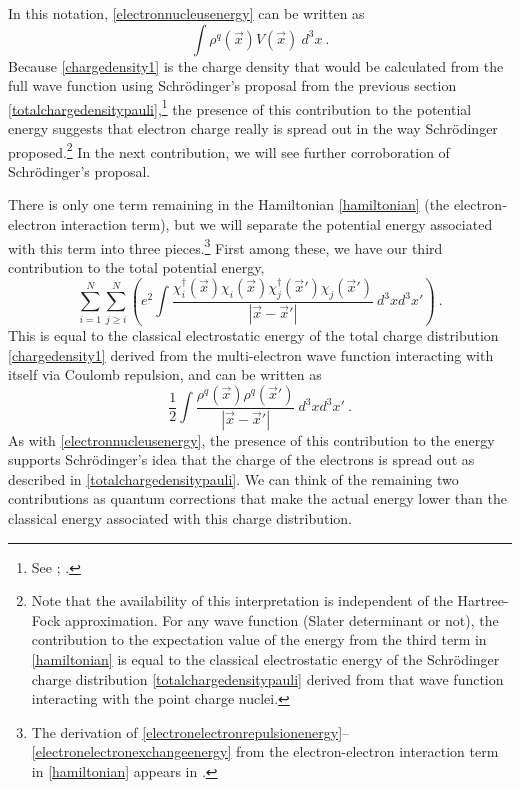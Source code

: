 \documentclass[onecolumn,secnumarabic,amsmath,amssymb,balancelastpage,nofootinbib]{article}
\begin{document}
In this notation, \eqref{electronnucleusenergy} can be written as
\begin{equation}
\int{\rho^q(\vec{x}) V(\vec{x}) \  d^3 x}
\ .
\label{electronnucleusenergy2}
\end{equation}
Because \eqref{chargedensity1} is the charge density that would be calculated from the full wave function using Schr\"{o}dinger's proposal from the previous section \eqref{totalchargedensitypauli},\footnote{See \cite[pg.\ 9]{bader1990}; \cite[problem 16.28]{levineQC}.}  the presence of this contribution to the potential energy suggests that electron charge really is spread out in the way Schr\"{o}dinger proposed.\footnote{Note that the availability of this interpretation is independent of the Hartree-Fock approximation.  For any wave function (Slater determinant or not), the contribution to the expectation value of the energy from the third term in \eqref{hamiltonian} is equal to the classical electrostatic energy of the Schr\"{o}dinger charge distribution \eqref{totalchargedensitypauli} derived from that wave function interacting with the point charge nuclei.}  In the next contribution, we will see further corroboration of Schr\"{o}dinger's proposal.

There is only one term remaining in the Hamiltonian \eqref{hamiltonian} (the electron-electron interaction term), but we will separate the potential energy associated with this term into three pieces.\footnote{The derivation of \eqref{electronelectronrepulsionenergy}--\eqref{electronelectronexchangeenergy} from the electron-electron interaction term in \eqref{hamiltonian} appears in \cite{blinder1965}.}  First among these, we have our third contribution to the total potential energy,
\begin{equation}
\sum_{i=1}^{N}\sum_{j \geq i}^{N}\left(e^2\int{\frac{\chi_i^{\dagger}(\vec{x})\chi_i(\vec{x})\chi_j^{\dagger}(\vec{x}')\chi_j(\vec{x}')}{|\vec{x}-\vec{x}'|}\  d^3 x d^3 x'}\right)
\ .
\label{electronelectronrepulsionenergy}
\end{equation}
This is equal to the classical electrostatic energy of the total charge distribution \eqref{chargedensity1} derived from the multi-electron wave function interacting with itself via Coulomb repulsion, and can be written as
\begin{equation}
\frac{1}{2}\int{\frac{\rho^q(\vec{x}) \rho^q(\vec{x}')}{|\vec{x}-\vec{x}'|}\  d^3 x d^3 x'}
\ .
\label{electronelectronrepulsionenergy2}
\end{equation}
As with \eqref{electronnucleusenergy}, the presence of this contribution to the energy supports Schr\"{o}dinger's idea that the charge of the electrons is spread out as described in \eqref{totalchargedensitypauli}.  We can think of the remaining two contributions as quantum corrections that make the actual energy lower than the classical energy associated with this charge distribution.
\end{document}
